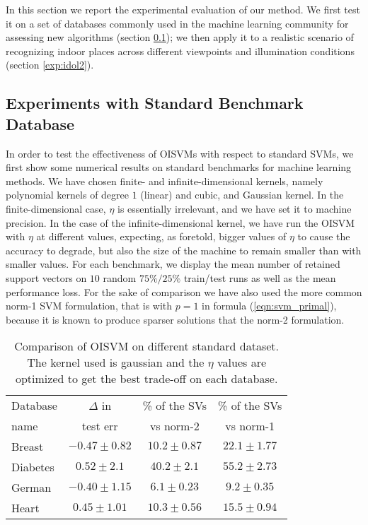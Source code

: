 In this section we report the experimental evaluation of our method.
We first test it on a set of databases commonly used in the machine 
learning community for assessing new algorithms (section \ref{exp:ml});
we then apply it to a realistic scenario of recognizing indoor places
across different viewpoints and illumination conditions 
(section \ref{exp:idol2}).

\subsection{Experiments with Standard Benchmark Database}
\label{exp:ml}

In order to test the effectiveness of OISVMs with respect to standard
SVMs, we first show some numerical results on standard benchmarks for machine 
learning methods. We have chosen finite- and infinite-dimensional kernels, namely
polynomial kernels of degree $1$ (linear) and cubic, and
Gaussian kernel. In the finite-dimensional case, $\eta$ is
essentially irrelevant, and we have set it to machine precision. 
In the case of the infinite-dimensional kernel, we have run the OISVM with
$\eta$ at different values, expecting, as foretold, bigger values of
$\eta$ to cause the accuracy to degrade, but also the size of the
machine to remain smaller than with smaller values.
For each benchmark, we display the mean number of retained support vectors
on $10$ random $75\%/25\%$ train/test runs as well as the mean performance loss.
For the sake of comparison we have also used the more common norm-1
SVM formulation, that is with $p=1$ in formula (\ref{eqn:svm_primal}), because
it is known to produce sparser solutions that the norm-2 formulation.

\begin{table}
\begin{center}
\begin{tabular}[!h]{|l|c|c|c|}
\hline
Database&$\Delta$ in&\% of the SVs&\% of the SVs\\
name&test err&vs norm-2&vs norm-1\\
\hline
Breast&$-0.47\pm0.82$&$10.2\pm0.87$&$22.1\pm1.77$\\
\hline
Diabetes&$0.52\pm2.1$&$40.2\pm2.1$&$55.2\pm2.73$\\
\hline
German&$-0.40\pm1.15$&$6.1\pm0.23$&$9.2\pm0.35$\\
\hline
Heart&$0.45\pm1.01$&$10.3\pm0.56$&$15.5\pm0.94$\\
\hline
\end{tabular}
\end{center}
\label{table:t1}
\caption{Comparison of OISVM on different standard dataset. The kernel used
 is gaussian and the $\eta$ values are optimized to get the best trade-off on
 each database.}
\end{table}

